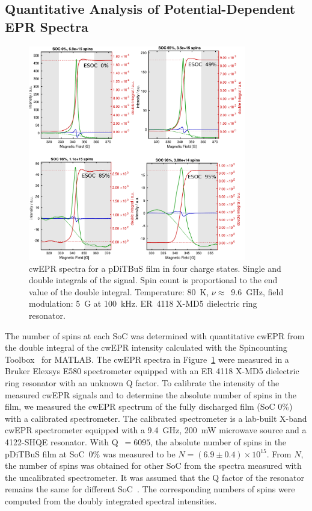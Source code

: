 \subsection{Quantitative Analysis of Potential-Dependent EPR Spectra}
\label{sec:quantitative_EPR}
\begin{figure}[h]
\center
	\includegraphics[width=0.85\textwidth]{./pulse/figures/Figure_S6}
	\caption{cwEPR spectra for a pDiTBuS film in four charge states. Single and double integrals of the signal. Spin count is proportional to the end value of the double integral. Temperature: 80~K, $\nu\approx$~9.6~GHz, field modulation: 5~G at 100~kHz. ER~4118 X-MD5 dielectric ring resonator.}
	\label{fig:Figure_S6}
\end{figure}

The number of spins at each SoC was determined with quantitative cwEPR from the double integral of the cwEPR intensity calculated with the Spincounting Toolbox~\cite{spincounting} for MATLAB. The cwEPR spectra in Figure~\ref{fig:Figure_S6} were measured in a Bruker Elexsys E580 spectrometer equipped with an ER 4118 X-MD5 dielectric ring resonator with an unknown Q factor. To calibrate the intensity of the measured cwEPR signals and to determine the absolute number of spins in the film, we measured the cwEPR spectrum of the fully discharged film (SoC 0\%) with a calibrated spectrometer. The calibrated spectrometer is a lab-built X-band cwEPR spectrometer equipped with a 9.4~GHz, 200~mW microwave source and a 4122-SHQE resonator. With Q~$=6095$, the absolute number of spins in the pDiTBuS film at SoC~0\% was measured to be $N=(6.9\pm0.4)\times10^{15}$. From $N$, the number of spins was obtained for other SoC from the spectra measured with the uncalibrated spectrometer. It was assumed that the Q factor of the resonator remains the same for different SoC~\cite{Kulikov2022}. The corresponding numbers of spins were computed from the doubly integrated spectral intensities.\\



